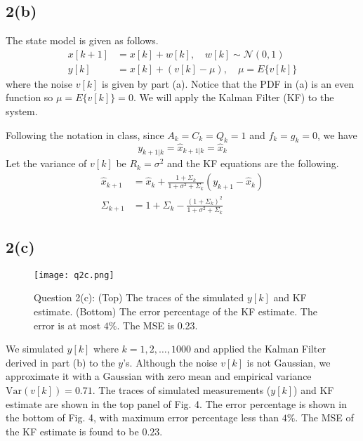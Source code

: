 \documentclass[a4paper, 11pt]{article}
\begin{document}
\subsection*{2(b)}

The state model is given as follows. 
\begin{equation}
\begin{split}
x[k+1] & = x[k] + w[k], \quad w[k]\sim\mathcal{N}(0,1)\\
y[k] & = x[k] + \left(v[k] - \mu \right), \quad \mu = E\{v[k]\}
\end{split}
\end{equation}
where the noise $v[k]$ is given by part (a). Notice that the PDF in (a) is an even function so $\mu =  E\{v[k]\} = 0$. We will apply the Kalman Filter (KF) to the system. 

Following the notation in class, since $A_k = C_k = Q_k = 1$ and $f_k = g_k = 0$, we have 
\begin{equation}
y_{k+1|k} = \hat{x}_{k+1|k} = \hat{x}_k
\end{equation}
Let the variance of $v[k]$ be $R_{k}=\sigma^2$ and the KF equations are the following. 
\begin{equation}
\begin{split}
\hat{x}_{k+1} & = \hat{x}_k + \frac{1 + \Sigma_k}{1 + \sigma^2 + \Sigma_k}\left( y_{k+1} - \hat{x}_k \right) \\
\Sigma_{k+1} & = 1 + \Sigma_k - \frac{(1 + \Sigma_k)^2}{1 + \sigma^2 + \Sigma_k}
\end{split}
\end{equation}


\subsection*{2(c)}

\begin{figure}
	\begin{center}
		\texttt{[image: q2c.png]}
		\caption{Question 2(c): (Top) The traces of the simulated $y[k]$ and KF estimate. (Bottom) The error percentage of the KF estimate. The error is at most $4\%$. The MSE is 0.23. }
	\end{center}
\end{figure}

We simulated $y[k]$ where $k=1,2,\dots,1000$ and applied the Kalman Filter derived in part (b) to the $y$'s. Although the noise $v[k]$ is not Gaussian, we approximate it with a Gaussian with zero mean and empirical variance $\text{Var}(v[k]) = 0.71$. The traces of simulated measurements ($y[k]$) and KF estimate are shown in the top panel of Fig. 4. The error percentage is shown in the bottom of Fig. 4, with maximum error percentage less than $4\%$. The MSE of the KF estimate is found to be $0.23$. 
\end{document}

